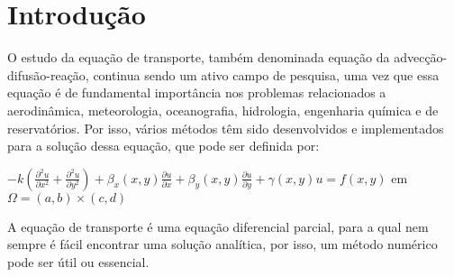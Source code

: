 \documentclass[
	article,			%
	11pt,				%
	oneside,			%
	a4paper,			%
	english,			%
	brazil,				%
	sumario=tradicional
	]{abntex2}
\begin{document}

\frenchspacing 


%
%
\maketitle




\textual

\section*{Introdução}

O estudo da equação de transporte, também denominada equação da advecção-difusão-reação, continua sendo um ativo campo
de pesquisa, uma vez que essa equação é de fundamental importância nos problemas relacionados a aerodinâmica, meteorologia,
oceanografia, hidrologia, engenharia química e de reservatórios. Por isso, vários métodos têm sido desenvolvidos e implementados
para a solução dessa equação, que pode ser definida por:

\begin{center}
$ -k \left(\frac{\partial^2 u}{\partial x^2}+\frac{\partial^2 u}{\partial y^2}\right)
+ \beta_x(x, y) \frac{\partial u}{\partial x} + \beta_y(x, y) \frac{\partial u}{\partial y} + \gamma(x, y) u=f(x,y) $
em $\Omega = (a,b) \times (c,d)$
\end{center}

A equação de transporte é uma equação diferencial parcial, para a qual nem sempre é fácil encontrar uma solução analítica,
por isso, um método numérico pode ser útil ou essencial.
\end{document}
